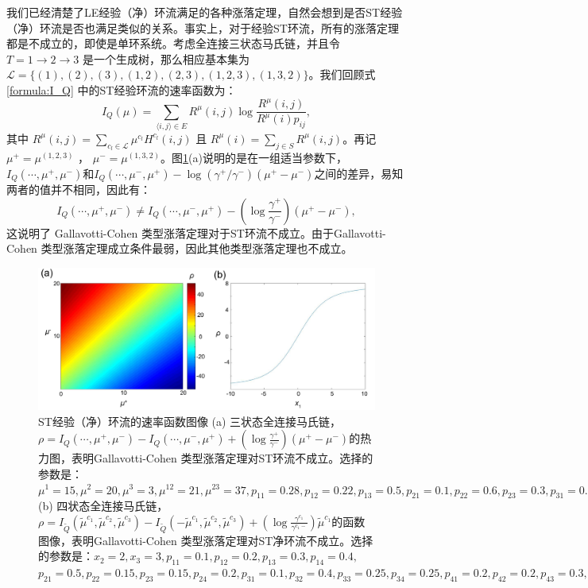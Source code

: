 我们已经清楚了LE经验（净）环流满足的各种涨落定理，自然会想到是否ST经验（净）环流是否也满足类似的关系。事实上，对于经验ST环流，所有的涨落定理都是不成立的，即使是单环系统。考虑全连接三状态马氏链，并且令 $T = 1\to 2\to 3$ 是一个生成树，那么相应基本集为$\mathcal{L} = \{(1),(2),(3),(1,2),(2,3),(1,2,3),(1,3,2)\}$。我们回顾式 \eqref{formula:I_Q} 中的ST经验环流的速率函数为：
\begin{equation*}
I_Q(\mu) = \sum_{\langle i,j\rangle\in E}R^{\mu}(i,j)\log\frac{R^{\mu}(i,j)}{R^{\mu}(i)p_{ij}},
\end{equation*}
其中 $R^{\mu}(i,j)=\sum_{c_l\in\mathcal{L}}\mu^{c_l}H^{c_l}(i,j)$ 且 $R^{\mu}(i)=\sum_{j\in S}R^{\mu}(i,j)$。再记 $\mu^+ = \mu^{(1,2,3)}$ ， $\mu^- = \mu^{(1,3,2)}$。图\ref{figure:ratefunction}(a)说明的是在一组适当参数下，$I_Q(\cdots,\mu^+,\mu^-)$和$I_Q(\cdots,\mu^-,\mu^+)-\log(\gamma^+ /\gamma^-) (\mu^+-\mu^-)$之间的差异，易知两者的值并不相同，因此有：
\begin{equation*}
I_Q(\cdots,\mu^+,\mu^-)
\neq I_Q(\cdots,\mu^-,\mu^+)-\left(\log\frac{\gamma^+}{\gamma^-}\right)(\mu^+-\mu^-),
\end{equation*}
这说明了 Gallavotti-Cohen 类型涨落定理对于ST环流不成立。由于Gallavotti-Cohen 类型涨落定理成立条件最弱，因此其他类型涨落定理也不成立。
\begin{figure}[h]
	\centering
	\includegraphics[scale=0.25]{chart/ratefunction.pdf}
	\caption{ST经验（净）环流的速率函数图像 (a) 三状态全连接马氏链，$\rho=I_Q(\cdots,\mu^+,\mu^-)-I_Q(\cdots,\mu^-,\mu^+)+(\log\frac{\gamma^+}{\gamma^-})(\mu^+-\mu^-)$的热力图，表明Gallavotti-Cohen 类型涨落定理对ST环流不成立。选择的参数是：$\mu^1=15, \mu^2=20, \mu^3=3, \mu^{12}=21, \mu^{23}=37, p_{11}=0.28, p_{12}=0.22, p_{13}=0.5, p_{21}=0.1,  p_{22} = 0.6, p_{23}=0.3, p_{31}=0.3, p_{32}=0.3, p_{33}=0.4$
    (b) 四状态全连接马氏链，$\rho=I_{\tilde{Q}}(\tilde{\mu}^{c_1},\tilde{\mu}^{c_2},\tilde{\mu}^{c_3})-  I_{\tilde{Q}}(-\tilde{\mu}^{c_1},\tilde{\mu}^{c_2},\tilde{\mu}^{c_3})+(\log\frac{\gamma^{c_1}}{\gamma^{c_1-}})\tilde{\mu}^{c_1}$的函数图像，表明Gallavotti-Cohen 类型涨落定理对ST净环流不成立。选择的参数是：$x_2 = 2, x_3 = 3, p_{11} = 0.1, p_{12} = 0.2, p_{13} = 0.3,p_{14} = 0.4,$ $p_{21} = 0.5, p_{22} = 0.15, p_{23} = 0.15, p_{24} = 0.2, p_{31} = 0.1, p_{32} = 0.4, p_{33} = 0.25, p_{34} = 0.25,
    p_{41} = 0.2, p_{42} = 0.2, p_{43} = 0.3, p_{44} = 0.3$}\label{figure:ratefunction}
\end{figure}
